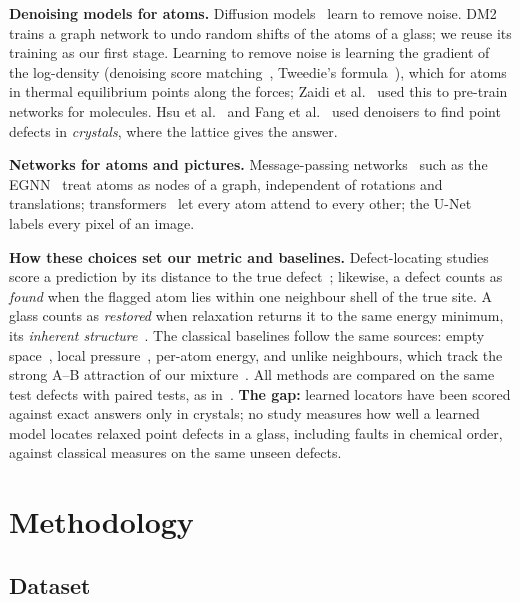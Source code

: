 \documentclass[10pt]{article}
\begin{document}
\textbf{Denoising models for atoms.} Diffusion models~\citep{ho2020ddpm,song2021sde} learn to remove noise. DM2~\citep{yang2026dm2} trains a graph network to undo random shifts of the atoms of a glass; we reuse its training as our first stage. Learning to remove noise is learning the gradient of the log-density (denoising score matching~\citep{vincent2011}, Tweedie's formula~\citep{efron2011}), which for atoms in thermal equilibrium points along the forces; Zaidi et al.~\citep{zaidi2023} used this to pre-train networks for molecules. Hsu et al.~\citep{hsu2024denoising} and Fang et al.~\citep{fang2026} used denoisers to find point defects in \emph{crystals}, where the lattice gives the answer.

\textbf{Networks for atoms and pictures.} Message-passing networks~\citep{gilmer2017mpnn} such as the EGNN~\citep{satorras2021egnn} treat atoms as nodes of a graph, independent of rotations and translations; transformers~\citep{vaswani2017,ying2021graphormer} let every atom attend to every other; the U-Net~\citep{ronneberger2015unet} labels every pixel of an image.

\textbf{How these choices set our metric and baselines.} Defect-locating studies score a prediction by its distance to the true defect~\citep{fang2026}; likewise, a defect counts as \emph{found} when the flagged atom lies within one neighbour shell of the true site. A glass counts as \emph{restored} when relaxation returns it to the same energy minimum, its \emph{inherent structure}~\citep{stillinger1982}. The classical baselines follow the same sources: empty space~\citep{starr2002,laakkonen1988}, local pressure~\citep{laakkonen1988}, per-atom energy, and unlike neighbours, which track the strong A--B attraction of our mixture~\citep{kob1995}. All methods are compared on the same test defects with paired tests, as in~\citep{richard2020}. \textbf{The gap:} learned locators have been scored against exact answers only in crystals; no study measures how well a learned model locates relaxed point defects in a glass, including faults in chemical order, against classical measures on the same unseen defects.

\section{Methodology}
\label{sec:method}

\subsection{Dataset}
\end{document}
